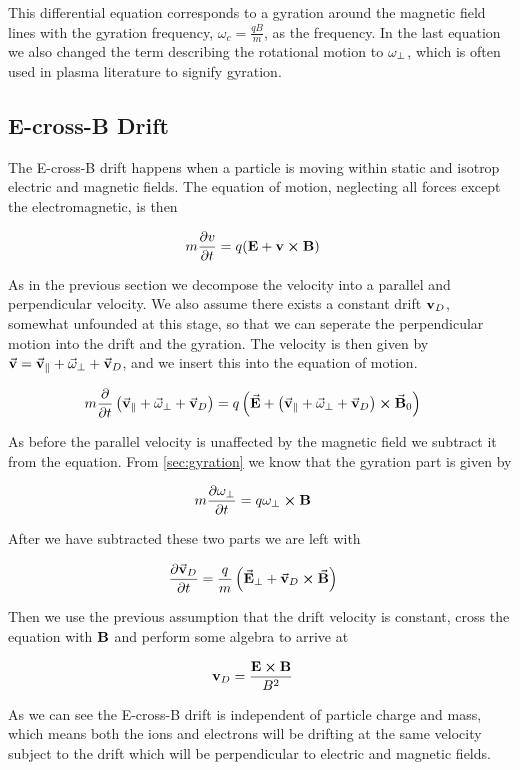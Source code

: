 		This differential equation corresponds to a gyration around the magnetic field lines
		with the gyration frequency, \(\omega_c = \frac{qB}{m}\), as the frequency.
		In the last equation we also changed the term describing the rotational motion
		to \(\vb{\omega}_\perp\), which is often used in plasma literature to
		signify gyration.

	\subsection{E-cross-B Drift}
	The E-cross-B drift happens when a particle is moving within static and isotrop
	electric and magnetic fields. The equation of motion, neglecting all forces
	except the electromagnetic, is then

	\begin{align}
		m\pdv{v}{t} &= q(\vb{E} + \vb{v}\cross\vb{B}) \label{eq:EcrossB}
	\end{align}

	As in the previous section we decompose the velocity into a parallel and perpendicular
 	velocity. We also assume there exists a constant drift \(\vb{v}_D\), somewhat unfounded at this stage,
	so that we can seperate the perpendicular motion into the drift and the gyration.
	The velocity is then given by \(\va{v} = \va{v}_\parallel + \va{\omega}_\perp + \va{v}_D\),
	and we insert this into the equation of motion.

	\begin{align}
		m\pdv{}{t}\left( \va{v}_\parallel + \va{\omega}_\perp + \va{v}_D\right) &=
		q \left( \va{E} +   \left( \va{v}_\parallel + \va{\omega}_\perp +
		\va{v}_D \right)  \cross \va{B}_0 \right)
	\end{align}


	As before the parallel velocity is unaffected by the magnetic field we subtract
	it from the equation. From \cref{sec:gyration} we know that the gyration
	part is given by

	\begin{align}
		m\pdv{\vb{\omega}_\perp}{t} &= q\vb{\vb{\omega}_\perp}\cross\vb{B}
	\end{align}

	After we have subtracted these two parts we are left with

	\begin{align}
		\pdv{\va{v}_D}{t} &= \frac{q}{m} \left( \va{E}_\perp + \va{v}_D \cross \va{B} \right)
	\end{align}

	Then we use the previous assumption that the drift velocity is constant,
	cross the equation with \(\vb{B}\) and perform some algebra to arrive at

	\begin{align}
		\vb{v}_D &= \frac{\vb{E}\cross\vb{B}}{B^2}
	\end{align}

	As we can see the E-cross-B drift is independent of particle charge and mass,
	which means both the ions and electrons will be drifting at the same velocity
	subject to the drift which will be perpendicular to electric and magnetic fields.
